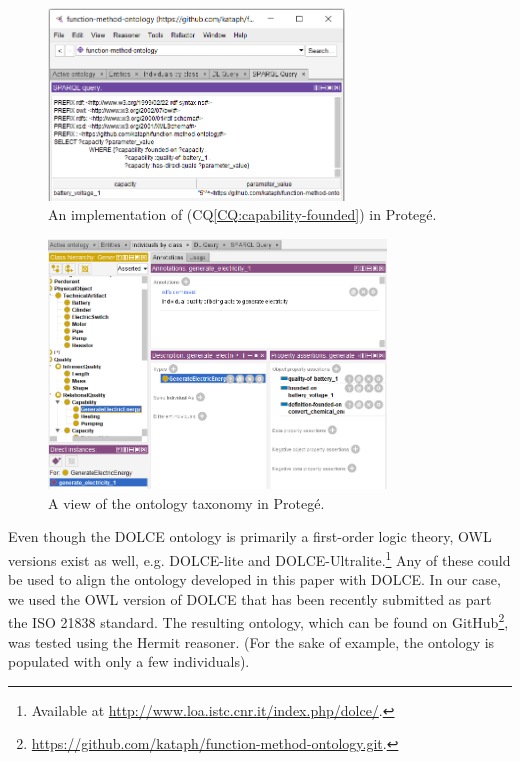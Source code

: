 \documentclass[sw]{iosart2x}
\newcommand{\CQLabel}{\textrm{CQ}}
\newcommand{\refCQ}[1]{({\CQLabel}\ref{#1})}
\newcommand{\DOLCE}{\textsc{DOLCE}\xspace} %
\newcommand{\OWL}{\textnormal{OWL}\xspace}
\begin{document}
\begin{figure}[t]
  \centering
  \includegraphics[width=0.7\textwidth]{query_screenshot.PNG}
  \caption{An implementation of \refCQ{CQ:capability-founded} in Protegé.\label{fig:screen_query}}
\end{figure}

\begin{figure}
  \centering
  \includegraphics[width=0.8\textwidth]{entities_screenshot.PNG}
  \caption{A view of the ontology taxonomy in Protegé.\label{fig:screen_entities}}
\end{figure}\marginpar{\color{red}{IntQ e RelQ sono sottoclassi di PQ}}

Even though the \DOLCE ontology is primarily a first-order logic theory, \OWL versions exist as well, e.g. \DOLCE-lite and \DOLCE-Ultralite.\footnote{Available at \url{http://www.loa.istc.cnr.it/index.php/dolce/}.}
Any of these could be used to align the ontology developed in this paper with \DOLCE. In our case, we used the \OWL version of \DOLCE that has been recently submitted as part the ISO 21838 standard. %
The resulting ontology, which can be found on GitHub\footnote{\url{https://github.com/kataph/function-method-ontology.git}.}, was tested using the Hermit reasoner.
(For the sake of example, the ontology is populated with only a few individuals).
\end{document}
